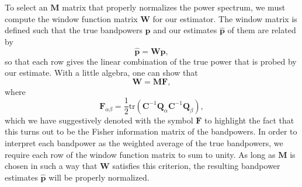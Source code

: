 \documentclass[twocolumn,numberedappendix]{emulateapj} \shorttitle{New Limits on the 21 cm Power Spectrum at $z=8.4$}
\begin{document}
To select an $\mathbf{M}$ matrix that properly normalizes the power spectrum, we must compute
the window function matrix $\mathbf{W}$ for our estimator. The window matrix is defined such that
the true bandpowers $\mathbf{p}$ and our estimates $\hat{\mathbf{p}}$ of them are related by
\begin{equation}\label{eqn:true_pspec_2_est_pspec}
\hat{\mathbf{p}} = \mathbf{W} \mathbf{p},
\end{equation}
so that each row gives the linear combination of the true power that is probed by our estimate. With
a little algebra, one can show that 
\begin{equation}\label{eqn:window_def}
    \mathbf{W} = \mathbf{M}\mathbf{F}, 
\end{equation}
where
\begin{equation}
\label{eq:FisherMatrix}
\mathbf{F}_{\alpha\beta} =
\frac{1}{2}\textrm{tr}(\mathbf{C}^{-1}\mathbf{Q}_{\alpha}\mathbf{C}^{-1}\mathbf{Q}_{\beta}),
\end{equation}
which we have suggestively denoted with the symbol $\mathbf{F}$ to highlight the fact that this turns out to be the Fisher
information matrix of the bandpowers. In order to interpret each bandpower as the weighted
average of the true bandpowers, we require each row of the window function matrix to sum to
unity. As long as $\mathbf{M}$ is chosen in such a way that $\mathbf{W}$ satisfies this criterion, the resulting bandpower estimates
$\hat{\mathbf{p}}$ will be properly normalized.

%
\end{document}
